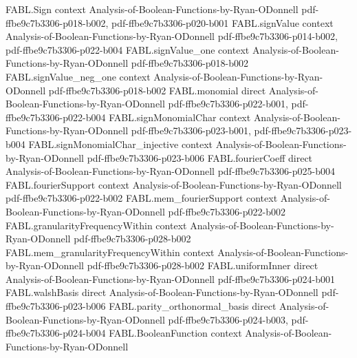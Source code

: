 \begin{theorem}
\label{FABL.majority_odd_isBalanced}
\leanok
{}
\proofstep
  {FABL.Sign}
  {context}
  {Analysis-of-Boolean-Functions-by-Ryan-ODonnell}
  {pdf-ffbe9c7b3306-p018-b002,
    pdf-ffbe9c7b3306-p020-b001}
\proofstep
  {FABL.signValue}
  {context}
  {Analysis-of-Boolean-Functions-by-Ryan-ODonnell}
  {pdf-ffbe9c7b3306-p014-b002,
    pdf-ffbe9c7b3306-p022-b004}
\proofstep
  {FABL.signValue_one}
  {context}
  {Analysis-of-Boolean-Functions-by-Ryan-ODonnell}
  {pdf-ffbe9c7b3306-p018-b002}
\proofstep
  {FABL.signValue_neg_one}
  {context}
  {Analysis-of-Boolean-Functions-by-Ryan-ODonnell}
  {pdf-ffbe9c7b3306-p018-b002}
\proofstep
  {FABL.monomial}
  {direct}
  {Analysis-of-Boolean-Functions-by-Ryan-ODonnell}
  {pdf-ffbe9c7b3306-p022-b001,
    pdf-ffbe9c7b3306-p022-b004}
\proofstep
  {FABL.signMonomialChar}
  {context}
  {Analysis-of-Boolean-Functions-by-Ryan-ODonnell}
  {pdf-ffbe9c7b3306-p023-b001,
    pdf-ffbe9c7b3306-p023-b004}
\proofstep
  {FABL.signMonomialChar_injective}
  {context}
  {Analysis-of-Boolean-Functions-by-Ryan-ODonnell}
  {pdf-ffbe9c7b3306-p023-b006}
\proofstep
  {FABL.fourierCoeff}
  {direct}
  {Analysis-of-Boolean-Functions-by-Ryan-ODonnell}
  {pdf-ffbe9c7b3306-p025-b004}
\proofstep
  {FABL.fourierSupport}
  {context}
  {Analysis-of-Boolean-Functions-by-Ryan-ODonnell}
  {pdf-ffbe9c7b3306-p022-b002}
\proofstep
  {FABL.mem_fourierSupport}
  {context}
  {Analysis-of-Boolean-Functions-by-Ryan-ODonnell}
  {pdf-ffbe9c7b3306-p022-b002}
\proofstep
  {FABL.granularityFrequencyWithin}
  {context}
  {Analysis-of-Boolean-Functions-by-Ryan-ODonnell}
  {pdf-ffbe9c7b3306-p028-b002}
\proofstep
  {FABL.mem_granularityFrequencyWithin}
  {context}
  {Analysis-of-Boolean-Functions-by-Ryan-ODonnell}
  {pdf-ffbe9c7b3306-p028-b002}
\proofstep
  {FABL.uniformInner}
  {direct}
  {Analysis-of-Boolean-Functions-by-Ryan-ODonnell}
  {pdf-ffbe9c7b3306-p024-b001}
\proofstep
  {FABL.walshBasis}
  {direct}
  {Analysis-of-Boolean-Functions-by-Ryan-ODonnell}
  {pdf-ffbe9c7b3306-p023-b006}
\proofstep
  {FABL.parity_orthonormal_basis}
  {direct}
  {Analysis-of-Boolean-Functions-by-Ryan-ODonnell}
  {pdf-ffbe9c7b3306-p024-b003,
    pdf-ffbe9c7b3306-p024-b004}
\proofstep
  {FABL.BooleanFunction}
  {context}
  {Analysis-of-Boolean-Functions-by-Ryan-ODonnell}

\end{theorem}
